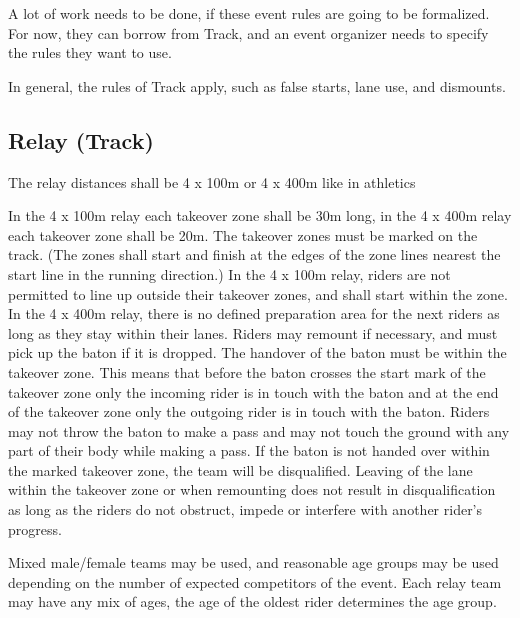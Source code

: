 \begin{comment2016}
  A lot of work needs to be done, if these event rules are going to be formalized.
  For now, they can borrow from Track, and an event organizer needs to specify the rules they want to use.
\end{comment2016}

In general, the rules of Track apply, such as false starts, lane use, and dismounts.

\subsection{Relay (Track)}
The relay distances shall be 4 x 100m or 4 x 400m like in athletics

In the 4 x 100m relay each takeover zone shall be 30m long, in the 4 x 400m relay each takeover zone shall be 20m.
The takeover zones must be marked on the track.
(The zones shall start and finish at the edges of the zone lines nearest the start line in the running direction.)
In the 4 x 100m relay, riders are not permitted to line up outside their takeover zones, and shall start within the zone.
In the 4 x 400m relay, there is no defined preparation area for the next riders as long as they stay within their lanes.
Riders may remount if necessary, and must pick up the baton if it is dropped.
The handover of the baton must be within the takeover zone.
This means that before the baton crosses the start mark of the takeover zone only the incoming rider is in touch with the baton and at the end of the takeover zone only the outgoing rider is in touch with the baton.
Riders may not throw the baton to make a pass and may not touch the ground with any part of their body while making a pass.
If the baton is not handed over within the marked takeover zone, the team will be disqualified.
Leaving of the lane within the takeover zone or when remounting does not result in disqualification as long as the riders do not obstruct, impede or interfere with another rider’s progress.

Mixed male/female teams may be used, and reasonable age groups may be used depending on the number of expected competitors of the event.
Each relay team may have any mix of ages, the age of the oldest rider determines the age group.


